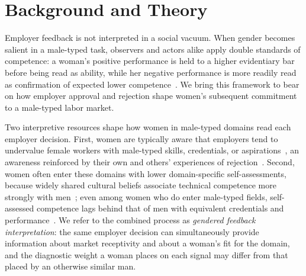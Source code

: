 \documentclass[12pt]{article}
\begin{document}
\section{Background and Theory}


Employer feedback is not interpreted in a social vacuum. When gender becomes salient in a male-typed task, observers and actors alike apply double standards of competence: a woman's positive performance is held to a higher evidentiary bar before being read as ability, while her negative performance is more readily read as confirmation of expected lower competence~\citep{foschi2000double, ridgeway2011framed, heilman2005nocredit}. We bring this framework to bear on how employer approval and rejection shape women's subsequent commitment to a male-typed labor market.

Two interpretive resources shape how women in male-typed domains read each employer decision. First, women are typically aware that employers tend to undervalue female workers with male-typed skills, credentials, or aspirations~\citep{murcianogoroff2021missing, correll2004constraints, wynn2018puncturing}, an awareness reinforced by their own and others' experiences of rejection~\citep{petersen2004opportunity, reskin1999job, brands2017leaning, barbulescu2013women}. Second, women often enter these domains with lower domain-specific self-assessments, because widely shared cultural beliefs associate technical competence more strongly with men~\citep{correll2001gender, eccles1994understanding, charles2009indulging, ridgeway2011framed}; even among women who do enter male-typed fields, self-assessed competence lags behind that of men with equivalent credentials and performance~\citep{sterling2020confidence}. We refer to the combined process as \emph{gendered feedback interpretation}: the same employer decision can simultaneously provide information about market receptivity and about a woman's fit for the domain, and the diagnostic weight a woman places on each signal may differ from that placed by an otherwise similar man.
\end{document}

